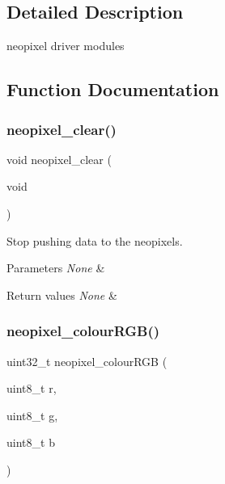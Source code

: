 \subsection{Detailed Description}
neopixel driver modules 



\subsection{Function Documentation}
\mbox{\label{group___neo_pixel_ga8e3cfef785ce221672f825f8785c25b8}} 
\subsubsection{\texorpdfstring{neopixel\+\_\+clear()}{neopixel\_clear()}}
{\footnotesize\ttfamily void neopixel\+\_\+clear (\begin{DoxyParamCaption}\item[{void}]{ }\end{DoxyParamCaption})}



Stop pushing data to the neopixels. 


\begin{DoxyParams}{Parameters}
{\em None} & \\
\hline
\end{DoxyParams}

\begin{DoxyRetVals}{Return values}
{\em None} & \\
\hline
\end{DoxyRetVals}
\mbox{\label{group___neo_pixel_ga1d500fbcbecad76feef8835437687ca0}} 
\subsubsection{\texorpdfstring{neopixel\+\_\+colour\+R\+G\+B()}{neopixel\_colourRGB()}}
{\footnotesize\ttfamily uint32\+\_\+t neopixel\+\_\+colour\+R\+GB (\begin{DoxyParamCaption}\item[{uint8\+\_\+t}]{r,  }\item[{uint8\+\_\+t}]{g,  }\item[{uint8\+\_\+t}]{b }\end{DoxyParamCaption})}



